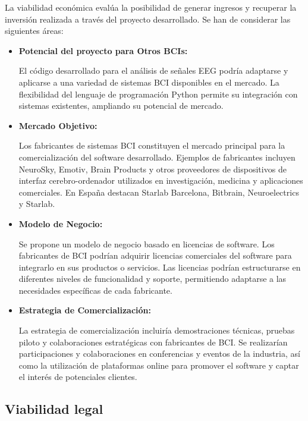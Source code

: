 La viabilidad económica evalúa la posibilidad de generar ingresos y recuperar la inversión realizada a través del proyecto desarrollado. Se han de considerar las siguientes áreas:
\begin{itemize}
\tightlist
   \item
    \textbf{Potencial del proyecto para Otros BCIs:} 
    
    El código desarrollado para el análisis de señales EEG podría adaptarse y aplicarse a una variedad de sistemas BCI disponibles en el mercado. La flexibilidad del lenguaje de programación Python permite su integración con sistemas existentes, ampliando su potencial de mercado.
    
   \item
    \textbf{Mercado Objetivo:} 
    
    Los fabricantes de sistemas BCI constituyen el mercado principal para la comercialización del software desarrollado. Ejemplos de fabricantes incluyen NeuroSky, Emotiv, Brain Products y otros proveedores de dispositivos de interfaz cerebro-ordenador utilizados en investigación, medicina y aplicaciones comerciales. En España destacan Starlab Barcelona, Bitbrain, Neuroelectrics y Starlab.
    
   \item
    \textbf{Modelo de Negocio:} 
    
    Se propone un modelo de negocio basado en licencias de software. Los fabricantes de BCI podrían adquirir licencias comerciales del software para integrarlo en sus productos o servicios. Las licencias podrían estructurarse en diferentes niveles de funcionalidad y soporte, permitiendo adaptarse a las necesidades específicas de cada fabricante.
    
   \item
    \textbf{Estrategia de Comercialización:}
    
    La estrategia de comercialización incluiría demostraciones técnicas, pruebas piloto y colaboraciones estratégicas con fabricantes de BCI. Se realizarían  participaciones y colaboraciones en conferencias y eventos de la industria, así como la utilización de plataformas online para promover el software y captar el interés de potenciales clientes.

\end{itemize}




\subsection{Viabilidad legal}


